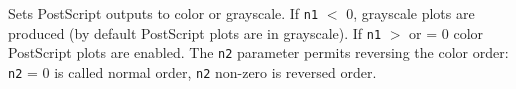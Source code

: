 \headb

Sets PostScript outputs to color or grayscale. If {\tt n1}
$<$ 0, grayscale plots are produced (by default PostScript
plots are in grayscale).  If {\tt n1} $>$ or = 0 color PostScript
plots are enabled.  The {\tt n2} parameter permits reversing the
color order: {\tt n2} = 0 is called normal order, {\tt n2} non-zero
is reversed order.
\vfill
\eject
